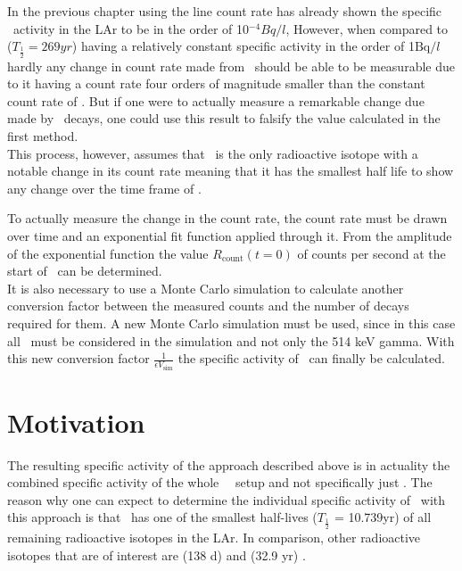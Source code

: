 \documentclass[encoding=utf8,british]{tumphthesis}
\begin{document}
In the previous chapter using the line count rate has already shown the specific \Kr\ activity in the LAr to be in the order of 10$^{-4} \unit{Bq}/\unit{l}$,
However, when compared to  ($T_{\frac{1}{2}} = 269\unit{yr}$) \cite{singh_nuclear_2006} having a relatively constant specific activity in the order of 1$\mathrm{Bq}/\unit{l}$ hardly any change in count rate made from \Kr\ should be able to be measurable due to it having a count rate four orders of magnitude smaller than the constant count rate of .
But if one were to actually measure a remarkable change due made by \Kr\ decays, one could use this result to falsify the value calculated in the first method.
\\

This process, however, assumes that \Kr\ is the only radioactive isotope with a notable change in its count rate meaning that it has the smallest half life to show any change over the time frame of \PII.




To actually measure the change in the count rate, the count rate must be drawn over time and an exponential fit function applied through it.
From the amplitude of the exponential function the value $R_{\mathrm{count}}(t=0)$ of counts per second at the start of \PII\ can be determined.
\\

It is also necessary to use a Monte Carlo simulation to calculate another conversion factor between the measured counts and the number of decays required for them. 
A new Monte Carlo simulation must be used, since in this case all \Kr\ must be considered in the simulation and not only the 514 keV gamma.
With this new conversion factor $\frac{1}{\epsilon V_{\mathrm{sim}}}$ the specific activity of \Kr\ can finally be calculated.

\section{Motivation}
\label{sec:motivation}
The resulting specific activity of the approach described above is in actuality the combined specific activity of the whole \gerda\ \PII\ setup and not specifically just \Kr.
The reason why one can expect to determine the individual specific activity of \Kr\ with this approach is that \Kr\ has one of the smallest half-lives ($T_{\frac{1}{2}}$ = 10.739\unit{yr}) of all remaining radioactive isotopes in the LAr. 
In comparison, other radioactive isotopes that are of interest are  (138 d)\cite{kondev_nuclear_2008} and  (32.9 yr) \cite{chen_nuclear_2016} .
\\
\end{document}

